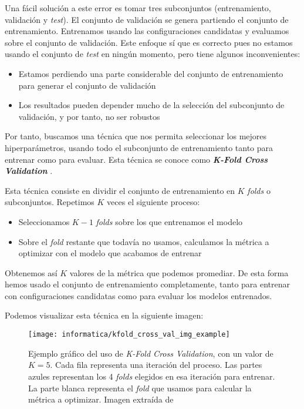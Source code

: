 Una fácil solución a este error es tomar tres subconjuntos (entrenamiento, validación y \textit{test}). El conjunto de validación se genera partiendo el conjunto de entrenamiento. Entrenamos usando las configuraciones candidatas y evaluamos sobre el conjunto de validación. Este enfoque sí que es correcto pues no estamos usando el conjunto de \textit{test} en ningún momento, pero tiene algunos inconvenientes:

\begin{itemize}
    \item Estamos perdiendo una parte considerable del conjunto de entrenamiento para generar el conjunto de validación
    \item Los resultados pueden depender mucho de la selección del subconjunto de validación, y por tanto, no ser robustos
\end{itemize}

Por tanto, buscamos una técnica que nos permita seleccionar los mejores hiperparámetros, usando todo el subconjunto de entrenamiento tanto para entrenar como para evaluar. Esta técnica se conoce como \textbf{\textit{K-Fold Cross Validation}} \cite{informatica:kfold_cross_val_paper}.

Esta técnica consiste en dividir el conjunto de entrenamiento en $K$ \textit{folds} o subconjuntos. Repetimos $K$ veces el siguiente proceso:

\begin{itemize}
    \item Seleccionamos $K-1$ \textit{folds} sobre los que entrenamos el modelo
    \item Sobre el \textit{fold} restante que todavía no usamos, calculamos la métrica a optimizar con el modelo que acabamos de entrenar
\end{itemize}

Obtenemos así $K$ valores de la métrica que podemos promediar. De esta forma hemos usado el conjunto de entrenamiento completamente, tanto para entrenar con configuraciones candidatas como para evaluar los modelos entrenados.

Podemos visualizar esta técnica en la siguiente imagen:

\begin{figure}[H]
    \centering
    \texttt{[image: informatica/kfold\_cross\_val\_img\_example]}
    \caption{Ejemplo gráfico del uso de \textit{K-Fold Cross Validation}, con un valor de $K = 5$. Cada fila representa una iteración del proceso. Las partes azules representan los 4 \textit{folds} elegidos en esa iteración para entrenar. La parte blanca representa el \textit{fold} que usamos para calcular la métrica a optimizar. Imagen extraída de \cite{informatica:kfold_cross_val_img_web}}
\end{figure}

